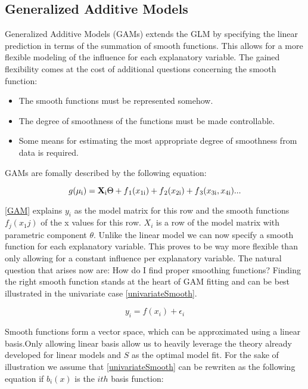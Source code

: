 \documentclass{article}
\begin{document}
    \subsection{Generalized Additive Models}
    Generalized Additive Models (GAMs) extends the GLM by specifying the linear prediction in terms of the summation of smooth functions. This allows for a more flexible modeling of the influence for each explanatory variable. The gained flexibility comes at the cost of additional questions concerning the smooth function:

    \begin{itemize}
        \item The smooth functions must be represented somehow.
        \item The degree of smoothness of the functions must be made controllable.
        \item Some means for estimating the most appropriate degree of smoothness from data is required.
    \end{itemize}

    GAMs are fomally described by the following equation:

    \begin{equation} \label{GAM} g(\mu\textsubscript{i}) = \mathbf{X} \textsubscript{i} \Theta + f\textsubscript{1}(x\textsubscript{1i}) + f\textsubscript{2}(x\textsubscript{2i}) + f\textsubscript{3}(x\textsubscript{3i}, x\textsubscript{4i}) ... \end{equation}

    \ref{GAM} explains $y_i$ as the model matrix for this row and the smooth functions $f_j(x_1j)$ of the x values for this row. $X_i$ is a row of the model matrix with parametric component $\theta$. Unlike the linear model we can now  specify a smooth function for each explanatory variable. This proves to be way more flexible than only allowing for a constant influence per explanatory variable. The natural question that arises now are: How do I find proper smoothing functions? Finding the right smooth function stands at the heart of GAM fitting and can be best illustrated in the univariate case \ref{univariateSmooth}.


    \begin{equation} \label{univariateSmooth} y_i = f(x_i) + \epsilon_i \end{equation}

     Smooth functions form a vector space, which can be approximated using a linear basis.Only allowing linear basis allow us to heavily leverage the theory already developed for linear models and $S$ as the optimal model fit. For the sake of illustration we assume that \ref{univariateSmooth} can be rewriten as the following equation if $b_i(x)$ is the $ith$ basis function:
\end{document}
